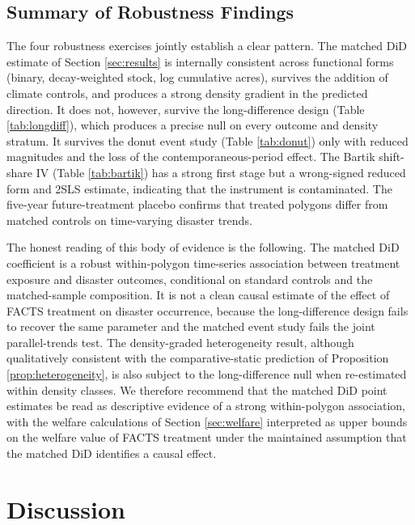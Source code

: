 \documentclass[12pt, letterpaper]{article}
\begin{document}
\subsection{Summary of Robustness Findings}

The four robustness exercises jointly establish a clear pattern. The matched DiD estimate of Section \ref{sec:results} is internally consistent across functional forms (binary, decay-weighted stock, log cumulative acres), survives the addition of climate controls, and produces a strong density gradient in the predicted direction. It does not, however, survive the long-difference design (Table \ref{tab:longdiff}), which produces a precise null on every outcome and density stratum. It survives the donut event study (Table \ref{tab:donut}) only with reduced magnitudes and the loss of the contemporaneous-period effect. The Bartik shift-share IV (Table \ref{tab:bartik}) has a strong first stage but a wrong-signed reduced form and 2SLS estimate, indicating that the instrument is contaminated. The five-year future-treatment placebo confirms that treated polygons differ from matched controls on time-varying disaster trends.

The honest reading of this body of evidence is the following. The matched DiD coefficient is a robust within-polygon time-series association between treatment exposure and disaster outcomes, conditional on standard controls and the matched-sample composition. It is not a clean causal estimate of the effect of FACTS treatment on disaster occurrence, because the long-difference design fails to recover the same parameter and the matched event study fails the joint parallel-trends test. The density-graded heterogeneity result, although qualitatively consistent with the comparative-static prediction of Proposition \ref{prop:heterogeneity}, is also subject to the long-difference null when re-estimated within density classes. We therefore recommend that the matched DiD point estimates be read as descriptive evidence of a strong within-polygon association, with the welfare calculations of Section \ref{sec:welfare} interpreted as upper bounds on the welfare value of FACTS treatment under the maintained assumption that the matched DiD identifies a causal effect.


\section{Discussion}\label{sec:discussion}
\end{document}
